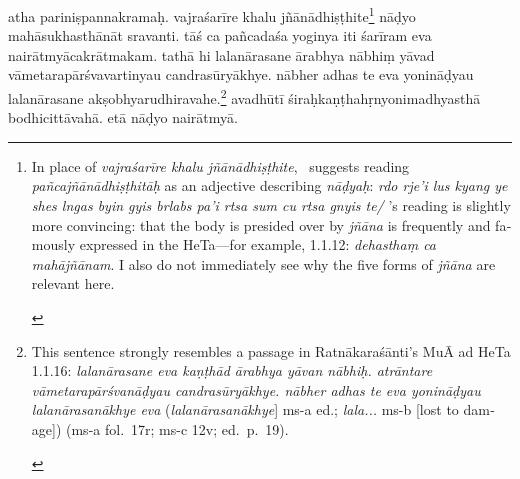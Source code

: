 \documentclass[naipra.tex]{subfiles}
\begin{document}
\begin{sanskrit}
\pstart
atha pariniṣpannakramaḥ.
vajraśarīre khalu jñānādhiṣṭhite\footnote{
	\begin{english}%
		In place of \emph{vajraśarīre khalu jñānādhiṣṭhite}, \TIB\ suggests reading \emph{pañcajñānādhiṣṭhitāḥ} as an adjective describing \emph{nāḍyaḥ}: \emph{rdo rje'i lus kyang ye shes lngas byin gyis brlabs pa'i rtsa sum cu rtsa gnyis te/} 
		\MSN 's reading is slightly more convincing: that the body is presided over by \emph{jñāna} is frequently and famously expressed in the HeTa—for example, 1.1.12: \emph{dehasthaṃ ca mahājñānam}.
		I also do not immediately see why the five forms of \emph{jñāna} are relevant here.
	\end{english}
}  nāḍyo mahāsukhasthānāt sravanti.
tāś ca pañcadaśa yoginya iti śarīram eva nairātmyācakrātmakam. 
tathā hi lalanārasane  ārabhya nābhiṃ yāvad vāmetarapārśvavartinyau candrasūryākhye.
nābher adhas te eva yonināḍyau lalanārasane akṣobhyarudhiravahe.\footnote{
	\begin{english}%
		This sentence strongly resembles a passage in Ratnākaraśānti's MuĀ ad HeTa 1.1.16:
		\emph{lalanārasane eva kaṇṭhād ārabhya yāvan nābhiḥ.
		atrāntare vāmetarapārśvanāḍyau candrasūryākhye.
		nābher adhas te eva yonināḍyau lalanārasanākhye eva} (\emph{lalanārasanākhye}] ms-a ed.; \emph{lala...} ms-b [lost to damage]) (ms-a fol.\ 17r; ms-c 12v; ed.\ p.\ 19).
	\end{english}
}
avadhūtī śiraḥkaṇṭhahṛnyonimadhyasthā bodhicittāvahā.
etā nāḍyo nairātmyā. 
\pend





\end{sanskrit}
\end{document}
